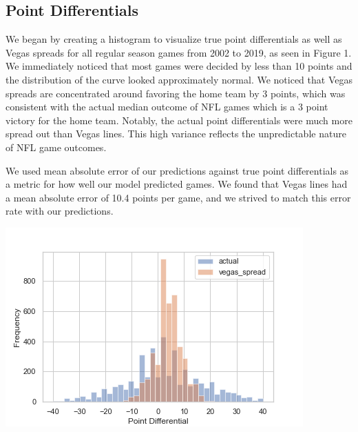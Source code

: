 \documentclass{article}
\newenvironment{Figure}
  {\par\medskip\noindent\minipage{\linewidth}}
  {\endminipage\par\medskip}
\begin{document}
\begin{multicols}{2}
\subsection{Point Differentials}
We began by creating a histogram to visualize true point differentials as well as Vegas spreads for all regular season games from 2002 to 2019, as seen in Figure 1. We immediately noticed that most games were decided by less than 10 points and the distribution of the curve looked approximately normal. We noticed that Vegas spreads are concentrated around favoring the home team by 3 points, which was consistent with the actual median outcome of NFL games which is a 3 point victory for the home team.  Notably, the actual point differentials were much more spread out than Vegas lines. This high variance reflects the unpredictable nature of NFL game outcomes. 

We used mean absolute error of our predictions against true point differentials as a metric for how well our model predicted games. We found that Vegas lines had a mean absolute error of 10.4 points per game, and we strived to match this error rate with our predictions.

\begin{Figure}
\centering  
 \includegraphics[width = 
 \columnwidth]{figs_final/vegas_vs_true.png}
\label{fig:histogram}
\end{Figure}

\end{multicols}
\end{document}
